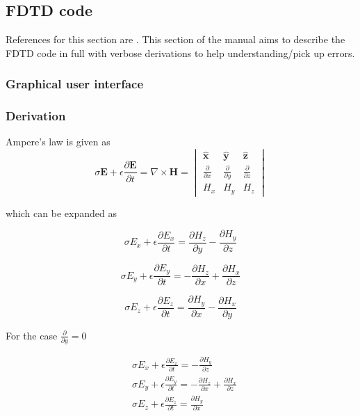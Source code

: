 \subsection{FDTD code}
References for this section are \cite{FDTD_Schneider}. This section of the manual aims to describe the FDTD code in full with verbose derivations to help understanding/pick up errors.
\subsubsection{Graphical user interface}
\subsubsection{Derivation}

Ampere’s law is given as  \cite{FDTD_Schneider}
\begin{equation}
\sigma  \boldsymbol{E} + \epsilon \frac{\partial  \boldsymbol{E}}{\partial t} = \nabla \times \boldsymbol{H} =
\begin{vmatrix} \hat{\boldsymbol{x}} & \hat{\boldsymbol{y}} & \hat{\boldsymbol{z}} \\ 
\frac{\partial}{\partial x} & \frac{\partial}{\partial y} & \frac{\partial}{\partial z} \\ 
H_{x} & H_{y} & H_{z}
\end{vmatrix}
\end{equation}


which can be expanded as

\begin{equation}
\sigma  E_{x} + \epsilon \frac{\partial  E_{x}}{\partial t} = \frac{\partial  H_{z}}{\partial y}-\frac{\partial  H_{y}}{\partial z}
\end{equation}

\begin{equation}
\sigma  E_{y} + \epsilon \frac{\partial  E_{y}}{\partial t} = -\frac{\partial  H_{z}}{\partial x}+\frac{\partial  H_{x}}{\partial z}
\end{equation}

\begin{equation}
\sigma  E_{z} + \epsilon \frac{\partial  E_{z}}{\partial t} = \frac{\partial  H_{y}}{\partial x}-\frac{\partial  H_{x}}{\partial y}
\end{equation}


For the case $\frac{\partial}{\partial y}=0$

\begin{equation}
\begin{split}
&\sigma  E_{x} + \epsilon \frac{\partial  E_{x}}{\partial t} =-\frac{\partial  H_{y}}{\partial z}\\
&\sigma  E_{y} + \epsilon \frac{\partial  E_{y}}{\partial t} = -\frac{\partial  H_{z}}{\partial x}+\frac{\partial  H_{x}}{\partial z}\\
&\sigma  E_{z} + \epsilon \frac{\partial  E_{z}}{\partial t} = \frac{\partial  H_{y}}{\partial x}
\end{split}
\end{equation}

